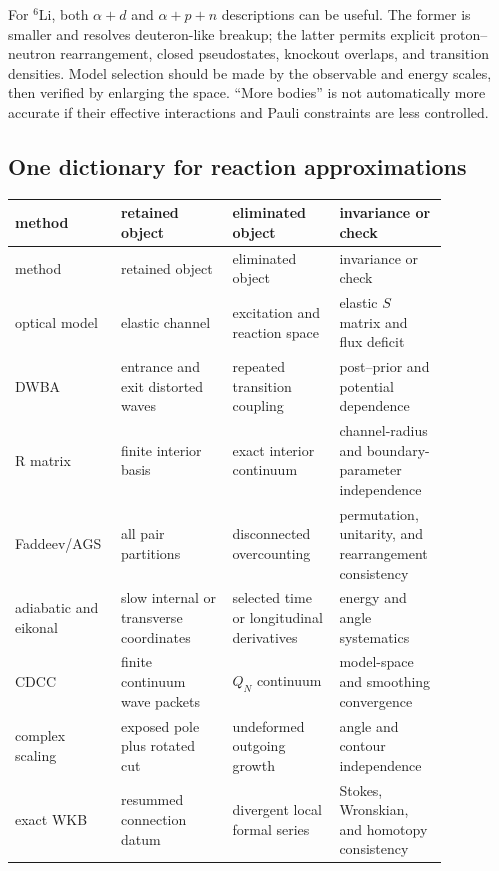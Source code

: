 For $^6$Li, both $\alpha+d$ and $\alpha+p+n$ descriptions can be useful.  The
former is smaller and resolves deuteron-like breakup; the latter permits
explicit proton--neutron rearrangement, closed pseudostates, knockout overlaps,
and transition densities.  Model selection should be made by the observable
and energy scales, then verified by enlarging the space.  ``More bodies'' is
not automatically more accurate if their effective interactions and Pauli
constraints are less controlled.

\subsection{One dictionary for reaction approximations}
\label{subsec:nuclear-method-dictionary}

\begin{longtable}{@{}p{0.18\linewidth}p{0.24\linewidth}p{0.23\linewidth}p{0.21\linewidth}@{}}
\toprule
method & retained object & eliminated object & invariance or check\\
\midrule
\endfirsthead
\toprule
method & retained object & eliminated object & invariance or check\\
\midrule
\endhead
optical model & elastic channel & excitation and reaction space & elastic
$S$ matrix and flux deficit\\
\addlinespace
DWBA & entrance and exit distorted waves & repeated transition coupling &
post--prior and potential dependence\\
\addlinespace
R matrix & finite interior basis & exact interior continuum & channel-radius
and boundary-parameter independence\\
\addlinespace
Faddeev/\allowbreak AGS & all pair partitions & disconnected overcounting & permutation,
unitarity, and rearrangement consistency\\
\addlinespace
adiabatic and eikonal & slow internal or transverse coordinates & selected time or
longitudinal derivatives & energy and angle systematics\\
\addlinespace
CDCC & finite continuum wave packets & $Q_N$ continuum & model-space and
smoothing convergence\\
\addlinespace
complex scaling & exposed pole plus rotated cut & undeformed outgoing growth &
angle and contour independence\\
\addlinespace
exact WKB & resummed connection datum & divergent local formal series & Stokes,
Wronskian, and homotopy consistency\\
\bottomrule
\end{longtable}

